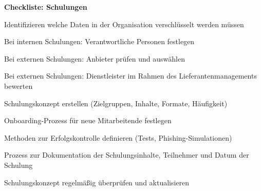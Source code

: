 \newpage
\vspace{1em}
\textbf{Checkliste: Schulungen}
\begin{checklist}
    \item Identifizieren welche Daten in der Organisation verschlüsselt werden müssen
    \item Bei internen Schulungen: Verantwortliche Personen festlegen
    \item Bei externen Schulungen: Anbieter prüfen und auswählen
    \item Bei externen Schulungen: Dienstleister im Rahmen des Lieferantenmanagements bewerten
    \item Schulungskonzept erstellen (Zielgruppen, Inhalte, Formate, Häufigkeit)
    \item Onboarding-Prozess für neue Mitarbeitende festlegen
    \item Methoden zur Erfolgskontrolle definieren (Tests, Phishing-Simulationen)
    \item Prozess zur Dokumentation der Schulungsinhalte, Teilnehmer und Datum der Schulung
    \item Schulungskonzept regelmäßig überprüfen und aktualisieren
\end{checklist}
